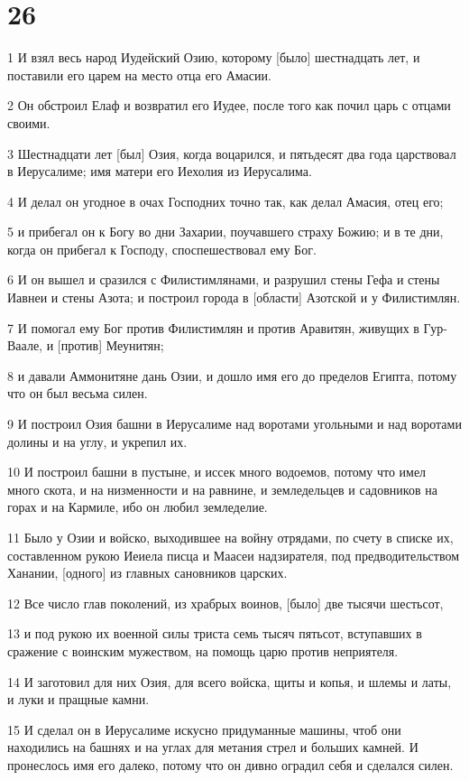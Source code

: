\chapter{26}

\par 1 И взял весь народ Иудейский Озию, которому [было] шестнадцать лет, и поставили его царем на место отца его Амасии.
\par 2 Он обстроил Елаф и возвратил его Иудее, после того как почил царь с отцами своими.
\par 3 Шестнадцати лет [был] Озия, когда воцарился, и пятьдесят два года царствовал в Иерусалиме; имя матери его Иехолия из Иерусалима.
\par 4 И делал он угодное в очах Господних точно так, как делал Амасия, отец его;
\par 5 и прибегал он к Богу во дни Захарии, поучавшего страху Божию; и в те дни, когда он прибегал к Господу, споспешествовал ему Бог.
\par 6 И он вышел и сразился с Филистимлянами, и разрушил стены Гефа и стены Иавнеи и стены Азота; и построил города в [области] Азотской и у Филистимлян.
\par 7 И помогал ему Бог против Филистимлян и против Аравитян, живущих в Гур-Ваале, и [против] Меунитян;
\par 8 и давали Аммонитяне дань Озии, и дошло имя его до пределов Египта, потому что он был весьма силен.
\par 9 И построил Озия башни в Иерусалиме над воротами угольными и над воротами долины и на углу, и укрепил их.
\par 10 И построил башни в пустыне, и иссек много водоемов, потому что имел много скота, и на низменности и на равнине, и земледельцев и садовников на горах и на Кармиле, ибо он любил земледелие.
\par 11 Было у Озии и войско, выходившее на войну отрядами, по счету в списке их, составленном рукою Иеиела писца и Маасеи надзирателя, под предводительством Ханании, [одного] из главных сановников царских.
\par 12 Все число глав поколений, из храбрых воинов, [было] две тысячи шестьсот,
\par 13 и под рукою их военной силы триста семь тысяч пятьсот, вступавших в сражение с воинским мужеством, на помощь царю против неприятеля.
\par 14 И заготовил для них Озия, для всего войска, щиты и копья, и шлемы и латы, и луки и пращные камни.
\par 15 И сделал он в Иерусалиме искусно придуманные машины, чтоб они находились на башнях и на углах для метания стрел и больших камней. И пронеслось имя его далеко, потому что он дивно оградил себя и сделался силен.
